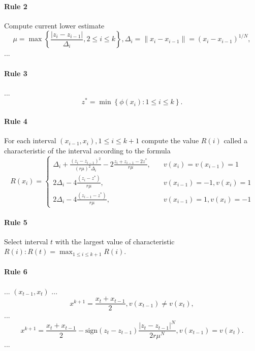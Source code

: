 \documentclass[runningheads]{llncs}
\begin{document}
\paragraph{Rule 2} Compute current lower estimate
\begin{equation}
\mu = \max\left\{ \frac{|z_i-z_{i-1}|}{\Delta _i}, 2 \leq i \leq k \right\} , \Delta _i= \| x_i -x_{i-1} \| =(x_i-x_{i-1})^{1/N},
\end{equation}
... 
\paragraph{Rule 3} ...
\begin{equation}
z^*=\min \left\{ \phi (x_i): 1\leq i \leq k \right\}.
\end{equation}

\paragraph{Rule 4} For each interval $(x_{i-1},x_i),1 \leq i \leq k+1$ compute the value $R(i)$ called a characteristic of the interval according to the formula
\begin{equation}
R(x_i)=
  \begin{cases}
    \Delta _i+\frac {{(z_i-z_{i-1})}^2}{{(r \mu)}^2 \Delta _i} - 2 \frac {z_i+z_{i-1}-2z^*}{r \mu}, & {\quad  v(x_i)=v(x_{i-1})=1}\\
    2 \Delta _i-4 \frac {(z_i-z^*)}{r \mu}, & {\quad  v(x_{i-1})=-1, v(x_i)=1}\\
    2 \Delta _i-4 \frac {(z_{i-1}-z^*)}{r \mu}, & {\quad  v(x_{i-1})=1, v(x_i)=-1}
  \end{cases}
\end{equation}

\paragraph{Rule 5} Select interval $t$ with the largest value of characteristic $R(i):R(t)= \max_{1 \leq i \leq k+1} R(i)$.
\paragraph{Rule 6} ... $(x_{t-1},x_t)$ ...
\begin{equation}
x^{k+1}=\frac {x_t+x_{t-1}}{2}, v(x_{t-1})\neq v(x_t),
\end{equation}
...
\begin{equation}
x^{k+1}= \frac {x_t+x_{t-1}}{2} -  \text{sign} {(z_t-z_{t-1})} \frac {{|z_t-z_{t-1}|}^N}{2r \mu ^N}, v(x_{t-1})=v(x_t).
\end{equation}
...
\end{document}
